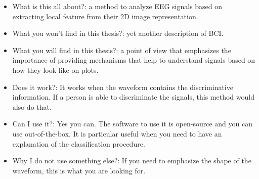 \begin{itemize}
\item What is this all about?: a method to analyze EEG signals based on extracting local feature from their 2D image representation.
\item What you won't find in this thesis?: yet another description of BCI.
\item What you will find in this thesis?: a point of view that emphasizes the importance of providing mechanisms that help to understand signals based on how they look like on plots.
\item Does it work?: It works when the waveform contains the discriminative information.  If a person is able to discriminate the signals, this method would also do that.
\item Can I use it?:  Yes you can.  The software to use it is open-source and you can use out-of-the-box.  It is particular useful when you need to have an explanation of the classification procedure.
\item Why I do not use something else?: If you need to emphasize the shape of the waveform, this is what you are looking for.
\end{itemize}

